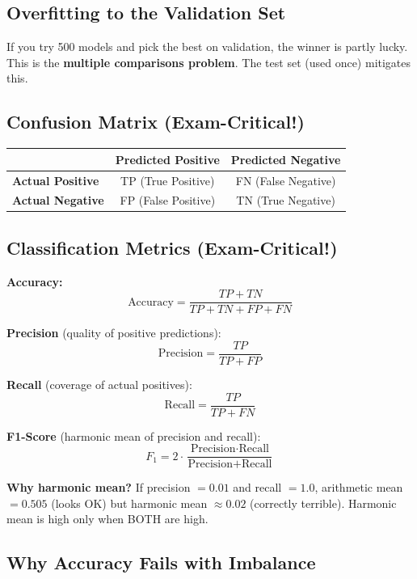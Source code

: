 \documentclass[11pt,a4paper]{article}
\begin{document}
\subsection{Overfitting to the Validation Set}

If you try 500 models and pick the best on validation, the winner is partly lucky. This is the \textbf{multiple comparisons problem}. The test set (used once) mitigates this.

\subsection{Confusion Matrix (Exam-Critical!)}

\begin{center}
\begin{tabular}{|l|c|c|}
\hline
 & \textbf{Predicted Positive} & \textbf{Predicted Negative} \\
\hline
\textbf{Actual Positive} & TP (True Positive) & FN (False Negative) \\
\textbf{Actual Negative} & FP (False Positive) & TN (True Negative) \\
\hline
\end{tabular}
\end{center}

\subsection{Classification Metrics (Exam-Critical!)}

\textbf{Accuracy:}
$$\text{Accuracy} = \frac{TP + TN}{TP + TN + FP + FN}$$

\textbf{Precision} (quality of positive predictions):
$$\text{Precision} = \frac{TP}{TP + FP}$$

\textbf{Recall} (coverage of actual positives):
$$\text{Recall} = \frac{TP}{TP + FN}$$

\textbf{F1-Score} (harmonic mean of precision and recall):
$$F_1 = 2 \cdot \frac{\text{Precision} \cdot \text{Recall}}{\text{Precision} + \text{Recall}}$$

\textbf{Why harmonic mean?} If precision $= 0.01$ and recall $= 1.0$, arithmetic mean $= 0.505$ (looks OK) but harmonic mean $\approx 0.02$ (correctly terrible). Harmonic mean is high only when BOTH are high.

\subsection{Why Accuracy Fails with Imbalance}
\end{document}
